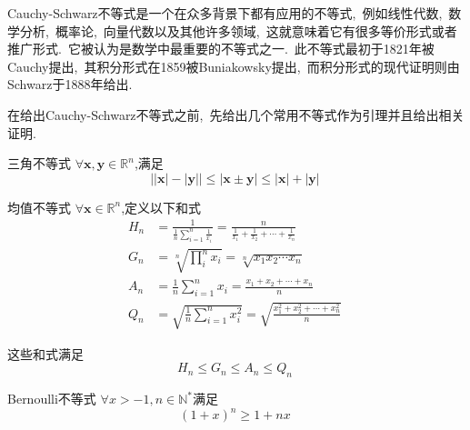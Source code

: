 Cauchy-Schwarz不等式是一个在众多背景下都有应用的不等式,\ 例如线性代数,\ 数学分析,\ 概率论,\ 向量代数以及其他许多领域,\ 这就意味着它有很多等价形式或者推广形式.\ 它被认为是数学中最重要的不等式之一.\ 此不等式最初于1821年被Cauchy提出,\ 其积分形式在1859被Buniakowsky提出,\ 而积分形式的现代证明则由Schwarz于1888年给出.\ 

在给出Cauchy-Schwarz不等式之前,\ 先给出几个常用不等式作为引理并且给出相关证明.\ 
\begin{lemma}{三角不等式}
$\forall \boldsymbol{x},\boldsymbol{y}\in\mathbb{R}^n$,满足
\begin{equation}
\lvert\lvert\boldsymbol{x}\rvert-\lvert\boldsymbol{y}\rvert\rvert\leqslant\lvert\boldsymbol{x}\pm\boldsymbol{y}\rvert\leqslant\lvert\boldsymbol{x}\rvert+\lvert\boldsymbol{y}\rvert~
\end{equation}
\end{lemma}
\begin{lemma}{均值不等式}
$\forall \boldsymbol{x}\in\mathbb{R}^n$,定义以下和式
\begin{align}
H_n&=\frac{1}{\frac{1}{n}\sum\limits_{i=1}^n\frac{1}{x_i}}=\frac{n}{\frac{1}{x_1}+\frac{1}{x_2}+\cdots+\frac{1}{x_n}}\\
G_n&=\sqrt[n]{\prod_{i}^n x_i}=\sqrt[n]{x_1x_2\cdots x_n}\\
A_n&=\frac{1}{n}\sum_{i=1}^n x_i=\frac{x_1+x_2+\cdots+x_n}{n}\\
Q_n&=\sqrt{\frac{1}{n}\sum_{i=1}^n x_i^2}=\sqrt{\frac{x_1^2+x_2^2+\cdots+x_n^2}{n}}~
\end{align}
\end{lemma}
这些和式满足
\begin{equation}
H_n\leqslant G_n\leqslant A_n \leqslant Q_n~
\end{equation}
\begin{lemma}{Bernoulli不等式}
$\forall x > -1,n \in \mathbb{N}^{\ast}$满足
\begin{equation}
(1+x)^n \geq 1+nx~
\end{equation}
\end{lemma}